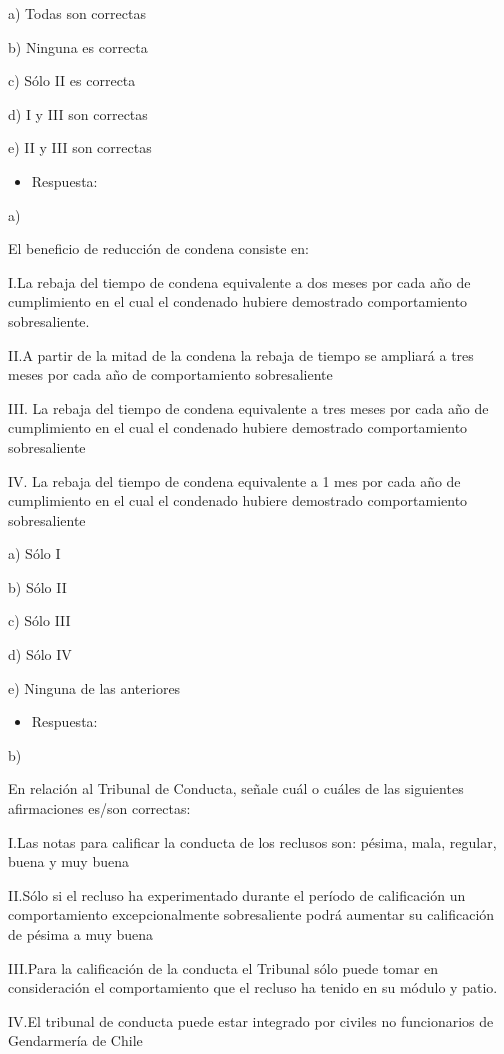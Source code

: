 \documentclass[letterpaper, 11pt]{article}
\begin{document}
a) Todas son correctas

b) Ninguna es correcta

c) Sólo II es correcta

d) I y III son correctas

e) II y III son correctas

\begin{itemize}
\item Respuesta:
\end{itemize}
a)


El beneficio de reducción de condena consiste en:

I.La rebaja del tiempo de condena equivalente a dos meses por cada año de
cumplimiento en el cual el condenado hubiere demostrado comportamiento
sobresaliente.

II.A partir de la mitad de la condena la rebaja de tiempo se ampliará a
tres meses por cada año de comportamiento sobresaliente

III. La rebaja del tiempo de condena equivalente a tres meses por cada año de
cumplimiento en el cual el condenado hubiere demostrado comportamiento
sobresaliente

IV. La rebaja del tiempo de condena equivalente a 1 mes por cada año de
cumplimiento en el cual el condenado hubiere demostrado comportamiento
sobresaliente

a) Sólo I

b) Sólo II

c) Sólo III

d) Sólo IV

e) Ninguna de las anteriores

\begin{itemize}
\item Respuesta:
\end{itemize}
b)


En relación al Tribunal de Conducta, señale cuál o cuáles de las siguientes
afirmaciones es/son correctas:

I.Las notas para calificar la conducta de los reclusos son: pésima, mala, regular,
buena y muy buena

II.Sólo si el recluso ha experimentado durante el período de calificación un
comportamiento excepcionalmente sobresaliente podrá aumentar su calificación
de pésima a muy buena

III.Para la calificación de la conducta el Tribunal sólo puede tomar en consideración el
comportamiento que el recluso ha tenido en su módulo y patio.

IV.El tribunal de conducta puede estar integrado por civiles no funcionarios de
Gendarmería de Chile
\end{document}
